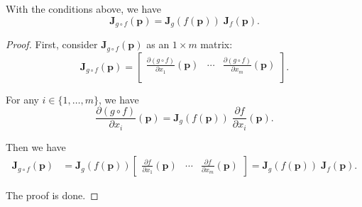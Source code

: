 \documentclass{article}
\begin{document}
\begin{proposition}	
	\label{prop: chain rule of jacobian}
	With the conditions above, we have
	$$
	\mathbf J_{g \circ f}(\mathbf p) = \mathbf J_{g}(f(\mathbf p)) \; \mathbf J_{f}(\mathbf p).
	$$
	
	\begin{proof}
		First, consider $\mathbf J_{g \circ f}(\mathbf p)$ as an $1 \times m$ matrix:
		$$
		\mathbf J_{g \circ f}(\mathbf p) =
		\left[
		\begin{matrix}
			\displaystyle \frac{\partial (g \circ f)}{\partial x_1}(\mathbf p) & \cdots & \displaystyle \frac{\partial (g \circ f)}{\partial x_m}(\mathbf p) \\
		\end{matrix}
		\right].
		$$
		
		For any $i \in \{1, \ldots, m\}$, we have
		$$
		\frac{\partial (g \circ f)}{\partial x_i}(\mathbf p) = \mathbf J_{g}(f(\mathbf p)) \; \frac{\partial f}{\partial x_i}(\mathbf p).
		$$
		
		Then we have
		$$
		\begin{aligned}
			\mathbf J_{g \circ f}(\mathbf p) &= \mathbf J_g (f(\mathbf p))
			\left[
			\begin{matrix}
				\displaystyle \frac{\partial f}{\partial x_1}(\mathbf p) & \cdots & \displaystyle \frac{\partial f}{\partial x_m}(\mathbf p)
			\end{matrix}
			\right]
			= \mathbf J_g (f(\mathbf p)) \; \mathbf J_f(\mathbf p).
		\end{aligned}
		$$ 
		
		The proof is done.
	\end{proof}
\end{proposition}
\end{document}
